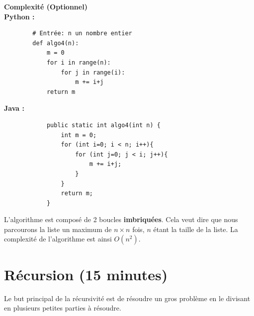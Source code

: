 \begin{Exercice}[10 minutes] \textbf{Complexité (Optionnel)} \\        
        \textbf{Python :}
        \begin{verbatim}
        # Entrée: n un nombre entier
        def algo4(n):
            m = 0
            for i in range(n):
                for j in range(i):
                    m += i+j
            return m
        \end{verbatim}
        
        \textbf{Java :}
        \begin{verbatim}
            public static int algo4(int n) {
                int m = 0;
                for (int i=0; i < n; i++){
                    for (int j=0; j < i; j++){
                        m += i+j;
                    }
                }
                return m;
            }
        \end{verbatim}
    \begin{solution} 
    L'algorithme est composé de 2 boucles \textbf{imbriquées}. Cela veut dire que nous parcourons la liste un maximum de $n \times n$ fois, $n$ étant la taille de la liste. La complexité de l'algorithme est ainsi $O(n^2)$.
    \end{solution}
    
\end{Exercice}
    
        
\section{Récursion (15 minutes)}

Le but principal de la récursivité est de résoudre un gros problème en le divisant en plusieurs petites parties à résoudre.

